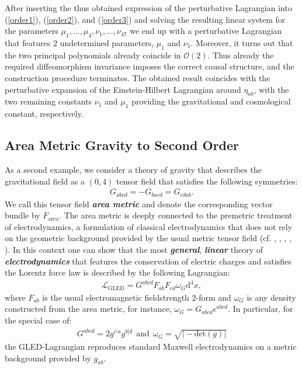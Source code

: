 \documentclass[%
 reprint,
nofootinbib,
 amsmath,amssymb,
 aps,
 prd,
floatfix,
]{revtex4-2}
\begin{document}
After inserting the thus obtained expression of the perturbative Lagrangian into (\ref{order1}), (\ref{order2}), and (\ref{order3}) and solving the resulting linear system for the parameters $\mu_1, ..., \mu_4, \nu_1, ..., \nu_{47}$ we end up with a perturbative Lagrangian that features $2$ undetermined parameters, $\mu_1$ and $\nu_1$. 
Moreover, it turns out that the two principal polynomials already coincide in $\mathcal{O}(2)$. 
Thus already the required diffeomorphism invariance imposes the correct causal structure, and the construction procedure terminates. 
The obtained result coincides with the perturbative expansion of the Einstein-Hilbert Lagrangian around $\eta_{ab}$, with the two remaining constants $\nu_1$ and $\mu_1$ providing the gravitational and cosmological constant, respectively.
\subsection{Area Metric Gravity to Second Order}
As a second example, we consider a theory of gravity that describes the gravitational field as a $(0,4)$ tensor field that satisfies the following symmetries:
\begin{align}\label{areaSym}
    G_{abcd} = -G_{bacd} = G_{cdab}.
\end{align}
We call this tensor field \textit{\textbf{area metric}} and denote the corresponding vector bundle by $F_{\text{area}}$. 
The area metric is deeply connected to the premetric treatment of electrodynamics, a formulation of classical electrodynamics that does not rely on the geometric background provided by the usual metric tensor field (cf. \cite{hehl2003foundations}, \cite{Hehl2005}, \cite{2004PhRvD..70j5022L}, \cite{1999PhLB..458..466O}, \cite{2009JPhA...42U5402I}).
In this context one can show that the most \textit{\textbf{general}}, \textit{\textbf{linear}} theory of \textit{\textbf{electrodynamics}} that features the conservation of electric charges and satisfies the Lorentz force law is described by the following Lagrangian:
\begin{align}
    \mathcal{L}_{\text{GLED}} =  G^{abcd}F_{ab}F_{cd}\omega_G\mathrm{d}^4x,
\end{align}
where $F_{ab}$ is the usual electromagnetic fieldstrength $2$-form and $\omega_G$ is any density constructed from the area metric, for instance, $\omega_G = G_{abcd}\epsilon^{abcd}$. 
In particular, for the special case of:
\begin{align}
    G^{abcd} = 2 g^{c^[a}g^{b]d} \ \ \text{and} \ \  \omega_{G}=\sqrt{\vert -\mathrm{det}(g) \vert}
\end{align}
the GLED-Lagrangian reproduces standard Maxwell electrodynamics on a metric background provided by $g_{ab}$.
\end{document}
